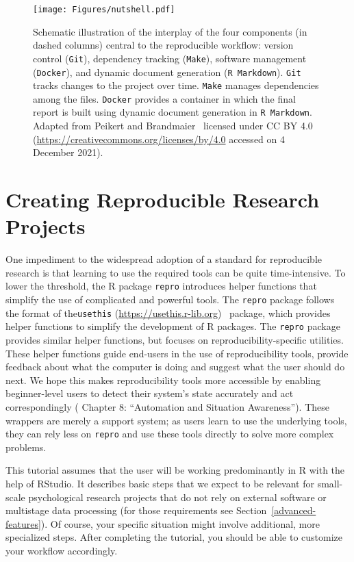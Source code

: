 \documentclass[psych,tutorial,accept,moreauthors,pdftex]{Definitions/mdpi}
\begin{document}
\begin{figure}[H]
\texttt{[image: Figures/nutshell.pdf]}
\caption{Schematic illustration of the interplay of the four
components (in dashed columns) central to the reproducible workflow:
version control (\texttt{Git}), dependency tracking (\texttt{Make}),
software management (\texttt{Docker}), and dynamic document generation
(\texttt{R\ Markdown}). \texttt{Git} tracks changes to the project over
time. \texttt{Make} manages dependencies among the files.
\texttt{Docker} provides a container in which the final report is built
using dynamic document generation in \texttt{R\ Markdown}. Adapted from
Peikert and Brandmaier~\citep{Peikert2019} licensed under CC BY 4.0 
(\url{https://creativecommons.org/licenses/by/4.0} accessed on 4 December 2021).}
\label{figure1}
\end{figure}

\section{Creating Reproducible Research
Projects}\label{creating-reproducible-research-projects}

One impediment to the widespread adoption of a standard for reproducible
research is that learning to use the required tools can be quite
time-intensive. To lower the threshold, the R package \texttt{repro}
introduces helper functions that simplify the use of complicated and
powerful tools. The \texttt{repro} package follows the format of the{\texttt{usethis}} 
 \mbox{(\url{https://usethis.r-lib.org})}~\citep{usethis}
package, which provides helper functions to simplify the development of
R packages. The \texttt{repro} package provides similar helper
functions, but focuses on reproducibility-specific utilities. These
helper functions guide end-users in the use of reproducibility tools,
provide feedback about what the computer is doing and suggest what the
user should do next. We hope this makes reproducibility tools more
accessible by enabling beginner-level users to detect their system's
state accurately and act correspondingly (\citep{parasuramanAutomationHumanPerformance2018} Chapter 8: ``Automation
and Situation Awareness'').
These wrappers are merely a support system; as users learn to use the
underlying tools, they can rely less on \texttt{repro} and use these
tools directly to solve more complex problems.

This tutorial assumes that the user will be working predominantly in R
with the help of RStudio. It describes basic steps that we expect to be
relevant for small-scale psychological research projects that do not
rely on external software or multistage data processing (for those
requirements see Section~\ref{advanced-features}). Of course, your specific situation might involve additional,
more specialized steps. After completing the tutorial, you should be
able to customize your workflow accordingly.
\end{document}
